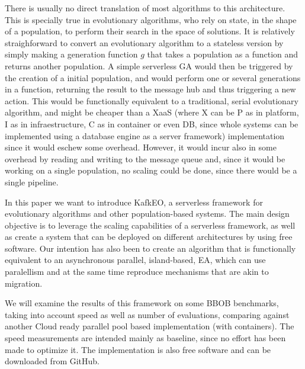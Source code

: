 \documentclass[sigconf]{acmart}
\begin{document}
There is usually no direct translation of most algorithms to this
architecture. This is specially true in evolutionary algorithms, who
rely on state, in the shape of a population, to perform their search
in the space of solutions. It is relatively straighforward to convert
an evolutionary algorithm to a stateless version by simply making a
{\sf generation} function $g$ that takes a population as a function
and returns another population. A simple serverless GA would then be
triggered by the creation of a initial population, and would perform
one or several generations in a function, returning the result to the
message hub and thus triggering a new action. This would be
functionally equivalent to a traditional, serial evolutionary
algorithm, and might be cheaper than a XaaS (where X can be P as in
platform, I as in infraestructure, C as in container or even DB, since
whole systems can be implemented using a database engine as a server framework) implementation since it
would eschew some overhead. However, it would incur also in some
overhead by reading and writing to the message queue and, since it
would be working on a single population, no scaling could be done,
since there would be a single pipeline.

In this paper we want to introduce KafkEO, a serverless framework for
evolutionary algorithms and other population-based systems. The main
design objective is to leverage the scaling capabilities of a
serverless framework, as well as create a system that can be deployed
on different architectures by using free software. Our intention has
also been to create an algorithm that is functionally equivalent to an asynchronous
parallel, island-based, EA, which can use paralellism and at the same
time reproduce mechanisms that are akin to migration.

We will examine the results of this framework on some BBOB benchmarks,
taking into account speed as well as number of evaluations, comparing
against another Cloud ready parallel pool based implementation (with
containers). The speed measurements are intended mainly as baseline,
since no effort has been made to optimize it.
The
implementation is also free software and can be downloaded from
GitHub.


\end{document}
